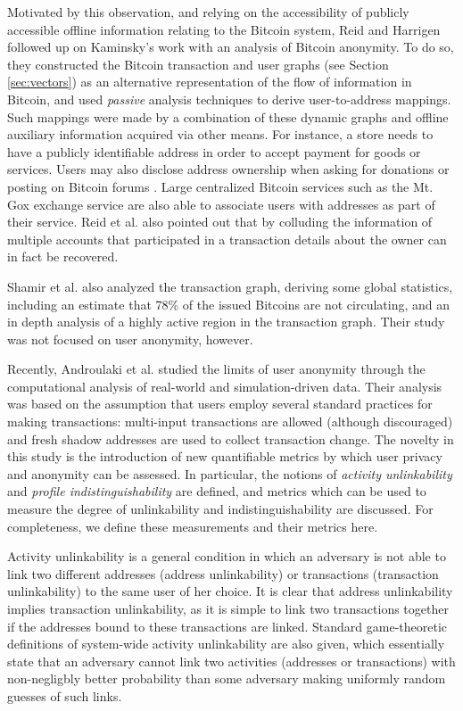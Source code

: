 Motivated by this observation, and relying on the accessibility of publicly accessible offline information relating to the Bitcoin system, Reid and Harrigen \cite{ReidHarrigan13} followed up on Kaminsky's work with an analysis of Bitcoin anonymity. To do so, they constructed the Bitcoin transaction and user graphs (see Section \ref{sec:vectors}) as an alternative representation of the flow of information in Bitcoin, and used \emph{passive} analysis techniques to derive user-to-address mappings. Such mappings were made by a combination of these dynamic graphs and offline auxiliary information acquired via other means. For instance, a store needs to have a publicly identifiable address in order to accept payment for goods or services. Users may also disclose address ownership when asking for donations or posting on Bitcoin forums \cite{Fistful12}. Large centralized Bitcoin services such as the Mt. Gox exchange service are also able to associate users with addresses as part of their service. Reid et al. also pointed out that by colluding the information of multiple accounts that participated in a transaction details about the owner can in fact be recovered. 

Shamir et al. \cite{Shamir13-bitcoingraph} also analyzed the transaction graph, deriving some global statistics, including an estimate that 78\% of the issued Bitcoins are not circulating, and an in depth analysis of a highly active region in the transaction graph. Their study was not focused on user anonymity, however. 

Recently, Androulaki et al. \cite{Androulaki12-privacy} studied the limits of user anonymity through the computational analysis of real-world and simulation-driven data. Their analysis was based on the assumption that users employ several standard practices for making transactions: multi-input transactions are allowed (although discouraged) and fresh shadow addresses are used to collect transaction change. The novelty in this study is the introduction of new quantifiable metrics by which user privacy and anonymity can be assessed. In particular, the notions of \emph{activity unlinkability} and \emph{profile indistinguishability} are defined, and metrics which can be used to measure the degree of unlinkability and indistinguishability are discussed. For completeness, we define these measurements and their metrics here.

Activity unlinkability is a general condition in which an adversary is not able to link two different addresses (address unlinkability) or transactions (transaction unlinkability) to the same user of her choice. It is clear that address unlinkability implies transaction unlinkability, as it is simple to link two transactions together if the addresses bound to these transactions are linked. Standard game-theoretic definitions of system-wide activity unlinkability are also given, which essentially state that an adversary cannot link two activities (addresses or transactions) with non-negligbly better probability than some adversary making uniformly random guesses of such links.

